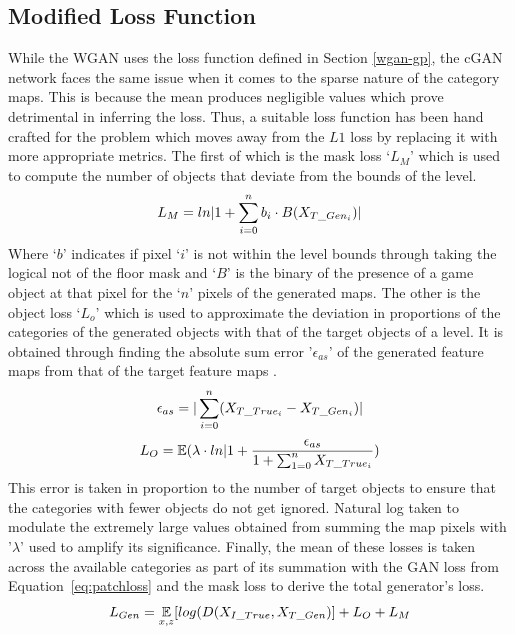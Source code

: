 \documentclass{Configuration_Files/PoliMi3i_thesis}
\begin{document}
\subsection{Modified Loss Function}
While the WGAN uses the loss function defined in Section \ref{wgan-gp}, the cGAN network 
faces the same issue when it comes to the sparse nature of the category maps. This is 
because the mean produces negligible values which prove detrimental in inferring 
the loss. Thus, a suitable loss function has been hand crafted for the problem which 
moves away from the $L1$ loss by replacing it with more appropriate metrics. The first 
of which is the mask loss ‘$L_{M}$’ which is used to compute the number of objects that 
deviate from the bounds of the level. 
\begin{equation} \label{eq:maskloss}
L_{M} = ln|1+\sum_{i=0}^n b_{i} \cdot B(X_{T\char`_Gen_{i}})|
\end{equation}
Where ‘$b$’ indicates if pixel ‘$i$' is not within the level bounds through taking the 
logical not of the floor mask and ‘$B$’ is the binary of the presence of a game object at 
that pixel for the ‘$n$’ pixels of the generated maps. The other is the object loss 
‘$L_{o}$’ which is used to approximate the deviation in proportions of the categories of the 
generated objects with that of the target objects of a level. It is obtained through 
finding the absolute sum error '$\epsilon_{as}$' of the generated feature maps from that of 
the target feature maps .
\begin{equation} \label{eq:ase}
\epsilon_{as} = |\sum_{i=0}^n (X_{T\char`_True_{i}} - X_{T\char`_Gen_{i}})|
\end{equation}
\begin{equation} \label{eq:objectloss}
L_{O} = \mathop{{}\mathbb{E}}(\lambda \cdot ln|1+ \dfrac{\epsilon_{as}}{1+ \sum_{1=0}^n X_{T\char`_True_{i}}})
\end{equation}
This error is taken in proportion to the number of target objects to ensure that the 
categories with fewer objects do not get ignored. Natural log taken to modulate the 
extremely large values obtained from summing the map pixels with '$\lambda$' used to 
amplify its significance. Finally, the mean of these losses is taken across the available
categories as part of its summation with the GAN loss from Equation~\ref{eq:patchloss} 
and the mask loss to derive the total generator’s loss.
\begin{equation} \label{eq:genloss}
L_{Gen}=\mathop{{}\mathbb{E}}_{x,z}[log(D(X_{I\char`_True},X_{T\char`_Gen})] + L_{O} + L_{M}
\end{equation}
\end{document}

